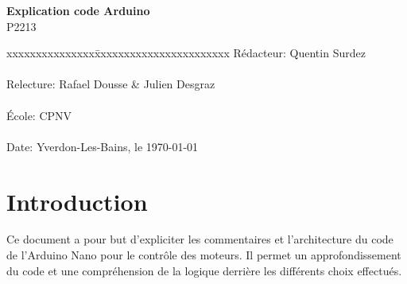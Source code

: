 \documentclass[
	a4paper,									%
	11pt,										%
	twoside,									%
	openright,									%
	notitlepage,									%
	parskip=half,								%
]{scrreprt}										%
\begin{document}
\begin{titlepage}
	\vspace{3cm}

	\fontsize{30pt}{32pt}\selectfont 
	\noindent \textbf{Explication code Arduino} \\

	\fontsize{18pt}{20pt}\selectfont\vspace{0.3em} P2213 \\

	\vspace{4cm}
	\fontsize{12pt}{15pt}\selectfont
	\begin{tabbing}
		xxxxxxxxxxxxxxx\=xxxxxxxxxxxxxxxxxxxxxxx \kill
		Rédacteur:\> Quentin Surdez\\ \\
		Relecture:\> Rafael Dousse \& Julien Desgraz\\ \\
		École:\> CPNV\\ \\
		Date:\> Yverdon-Les-Bains, le \today \\
	\end{tabbing}
\end{titlepage}

\tableofcontents

\listoffigures									%
\cleardoublepage

\setcounter{page}{1}

\chapter{Introduction}
Ce document a pour but d'expliciter les commentaires et l'architecture du code de l'Arduino Nano pour le contrôle des moteurs. 
Il permet un approfondissement du code et une compréhension de la logique derrière les différents choix effectués.

\end{document}
